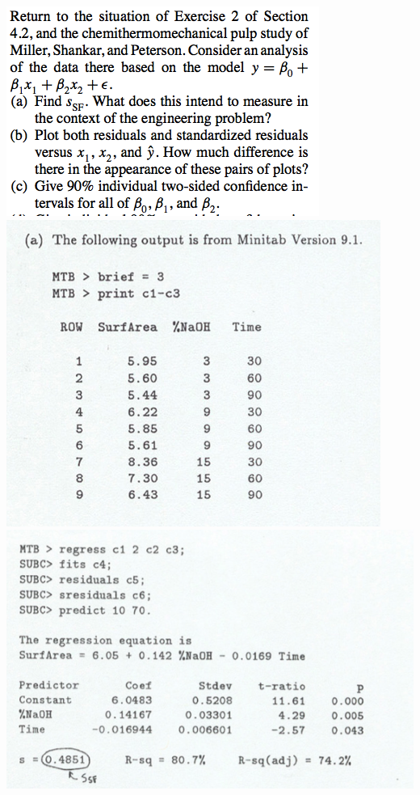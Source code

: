 \documentclass{article}\usepackage{graphicx, color}
\numberwithin{equation}{section}
\begin{document}
\begin{flushleft}
\begin{enumerate}[1. ]
 \includegraphics{../../fig/h11p4.png}
 \includegraphics{../../fig/h11p4sol1.png}
 \includegraphics{../../fig/h11p4sol2.png}

\end{enumerate}
\end{flushleft}
\end{document}
